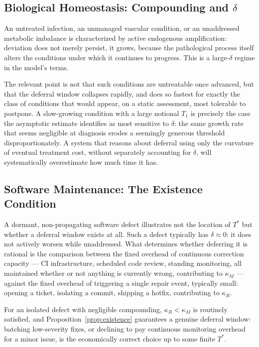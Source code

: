 \documentclass[11pt]{article}
\begin{document}
\subsection{Biological Homeostasis: Compounding and $\delta$}

An untreated infection, an unmanaged vascular condition, or an unaddressed metabolic imbalance is characterized by active endogenous amplification: deviation does not merely persist, it grows, because the pathological process itself alters the conditions under which it continues to progress. This is a large-$\delta$ regime in the model's terms.

The relevant point is not that such conditions are untreatable once advanced, but that the deferral window collapses rapidly, and does so fastest for exactly the class of conditions that would appear, on a static assessment, most tolerable to postpone. A slow-growing condition with a large notional $T_1$ is precisely the case the asymptotic estimate identifies as most sensitive to $\delta$: the same growth rate that seems negligible at diagnosis erodes a seemingly generous threshold disproportionately. A system that reasons about deferral using only the curvature of eventual treatment cost, without separately accounting for $\delta$, will systematically overestimate how much time it has.

\subsection{Software Maintenance: The Existence Condition}

A dormant, non-propagating software defect illustrates not the location of $T^*$ but whether a deferral window exists at all. Such a defect typically has $\delta \approx 0$: it does not actively worsen while unaddressed. What determines whether deferring it is rational is the comparison between the fixed overhead of continuous correction capacity — CI infrastructure, scheduled code review, standing monitoring, all maintained whether or not anything is currently wrong, contributing to $\kappa_M$ — against the fixed overhead of triggering a single repair event, typically small: opening a ticket, isolating a commit, shipping a hotfix, contributing to $\kappa_R$.

For an isolated defect with negligible compounding, $\kappa_R < \kappa_M$ is routinely satisfied, and Proposition~\ref{prop:existence} guarantees a genuine deferral window: batching low-severity fixes, or declining to pay continuous monitoring overhead for a minor issue, is the economically correct choice up to some finite $T^*$.
\end{document}
